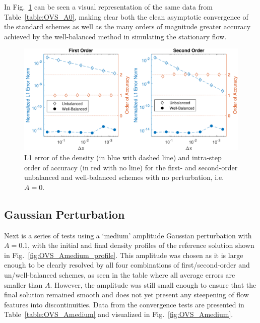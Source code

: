 In Fig.~\ref{fig:OVS_A0} can be seen a visual representation of the same data from Table~\ref{table:OVS_A0}, making clear both the clean asymptotic convergence of the standard schemes as well as the many orders of magnitude greater accuracy achieved by the well-balanced method in simulating the stationary flow.

\begin {figure}
\centering
\includegraphics[width=13cm]{figures/OVSeps0}
\caption {L1 error of the density (in blue with dashed line) and intra-step order of accuracy (in red with no line) for the first- and second-order unbalanced and well-balanced schemes with no perturbation, i.e.\ $A=0$.}
\label{fig:OVS_A0}
\end{figure}

\subsection{Gaussian Perturbation}

Next is a series of tests using a `medium' amplitude Gaussian perturbation with $A=0.1$, with the initial and final density profiles of the reference solution shown in Fig.~\ref{fig:OVS_Amedium_profile}. This amplitude was chosen as it is large enough to be clearly resolved by all four combinations of first/second-order and un/well-balanced schemes, as seen in the table where all average errors are smaller than $A$. However, the amplitude was still small enough to ensure that the final solution remained smooth and does not yet present any steepening of flow features into discontinuities. Data from the convergence tests are presented in Table~\ref{table:OVS_Amedium} and visualized in Fig.~\ref{fig:OVS_Amedium}.


